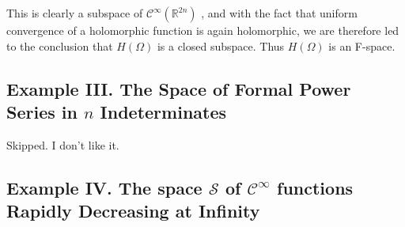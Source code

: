 This is clearly a subspace of $ \mathcal{C}^{ \infty } ( \mathbb{R}^{ 2n } ) $ , and with the fact that uniform convergence of a holomorphic function is again holomorphic, we are therefore led to the conclusion that $ H( \Omega ) $ is a closed subspace. Thus $ H( \Omega ) $ is an F-space.

\subsection{Example III. The Space of Formal Power Series in $ n $ Indeterminates}

Skipped.  I don't like it. 

\subsection{Example IV. The space $ \mathscr{S} $ of $ \mathcal{C}^{ \infty } $ functions Rapidly Decreasing at Infinity}
